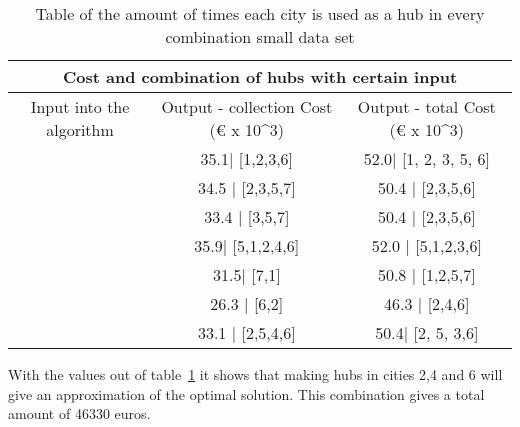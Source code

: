 \documentclass{article}
\begin{document}
               
            \begin{table}[h!]
                \begin{center}
                    \begin{tabular}{||c|c|c||}
                        \hline
                        \multicolumn{3}{||c||}{Cost and combination of hubs with certain input} \\
                        \hline
                        Input into the algorithm & Output -  collection Cost (€ x 10^3) & Output - total Cost (€ x 10^3)\\
                        \hline
                        [1] & 35.1| [1,2,3,6] & 52.0| [1, 2, 3, 5, 6]  \\
                        \hline
                        [2] & 34.5 | [2,3,5,7]   & 50.4 | [2,3,5,6] \\
                        \hline
                        [3]& 33.4 | [3,5,7] & 50.4 |  [2,3,5,6]\\
                        \hline
                        [5] &  35.9| [5,1,2,4,6]  &  52.0 | [5,1,2,3,6] \\
                        \hline
                        [7] &  31.5| [7,1] & 50.8 |  [1,2,5,7] \\
                        \hline
                        [6] & 26.3 | [6,2] & 46.3 |  [2,4,6]\\
                        \hline
                        [2, 5] & 33.1 | [2,5,4,6] & 50.4| [2, 5, 3,6]  \\
                        \hline
                    \end{tabular}
                \end{center}
            \caption{Table of the amount of times each city is used as a hub in every combination small data set}
            \label{amount of times hubs are used in collection small} 
            \end{table}
            
            With the values out of table~\ref{amount of times hubs are used in collection small} it shows that making hubs in cities 2,4 and 6 will give an approximation of the optimal solution. This combination gives a total amount of 46330 euros.
\end{document}
